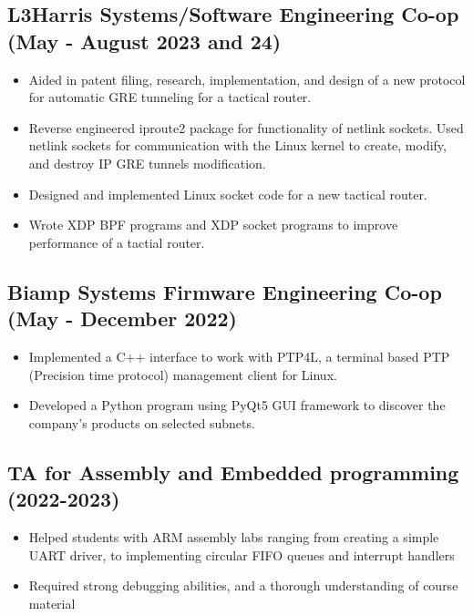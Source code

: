 \documentclass{article}
\begin{document}
    \subsection{L3Harris Systems/Software Engineering Co-op \hfill (May -
    August 2023 and 24)}
        \begin{itemize}[noitemsep]
            \item Aided in patent filing, research, implementation, and design
                of a new protocol for automatic GRE tunneling for a tactical router.
            \item Reverse engineered iproute2 package for functionality of
                netlink sockets. Used netlink sockets for communication with the
                Linux kernel to create, modify, and destroy IP GRE tunnels 
                modification.
            \item Designed and implemented Linux socket code for a new tactical
                router.
            \item Wrote XDP BPF programs and XDP socket programs to improve
                performance of a tactial router.
        \end{itemize}

    \subsection{Biamp Systems Firmware Engineering Co-op \hfill (May - December 2022)}
        \begin{itemize}[noitemsep]
            \item Implemented a C++ interface to work with PTP4L, a terminal based 
                PTP (Precision time protocol) management client for Linux.  
            \item Developed a Python program using PyQt5 GUI framework to
                discover the company's products on selected subnets.
        \end{itemize}

    \subsection{TA for Assembly and Embedded programming \hfill (2022-2023)}
    \begin{itemize}[noitemsep]
        \item Helped students with ARM assembly labs ranging from creating 
            a simple UART driver, to implementing circular FIFO queues and
            interrupt handlers
        \item Required strong debugging abilities, and a thorough understanding of 
            course material
    \end{itemize}
\end{document}
